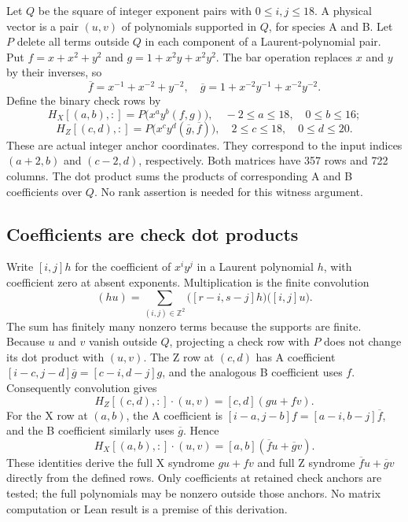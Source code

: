 \documentclass{article}
\begin{document}
Let \(Q\) be the square of integer exponent pairs with \(0 \le i, j \le 18\). A physical
vector is a pair \((u,v)\) of polynomials supported in \(Q\), for species A and B.
Let \(P\) delete all terms outside \(Q\) in each component of a Laurent-polynomial
pair. Put \(f = x + x^2 + y^2\) and \(g = 1 + x^2 y + x^2 y^2\). The bar operation
replaces \(x\) and \(y\) by their inverses, so
\begin{equation}
  \overline{f} = x^{-1} + x^{-2} + y^{-2}, \quad
  \overline{g} = 1 + x^{-2} y^{-1} + x^{-2} y^{-2}.
\end{equation}
Define the binary check rows by
\begin{equation}
  H_X[(a,b), {:}] = P\bigl(x^a y^b (f, g)\bigr), \quad -2 \le a \le 18, \quad 0 \le b \le 16;
\end{equation}
\begin{equation}
  H_Z[(c,d), {:}] = P\bigl(x^c y^d (\overline{g}, \overline{f})\bigr),
  \quad 2 \le c \le 18, \quad 0 \le d \le 20.
\end{equation}
These are actual integer anchor coordinates. They correspond to the input
indices \((a+2, b)\) and \((c-2, d)\), respectively. Both matrices have 357 rows and
722 columns. The dot product sums the products of corresponding A and B
coefficients over \(Q\). No rank assertion is needed for this witness argument.

\subsection{Coefficients are check dot products}\label{app:witness-coefficients}

Write \([i,j]h\) for the coefficient of \(x^i y^j\) in a Laurent polynomial \(h\),
with coefficient zero at absent exponents. Multiplication is the finite
convolution
\begin{equation}
  [r,s](hu) = \sum_{(i,j) \in \mathbb{Z}^2} \bigl([r-i, s-j]h\bigr) \bigl([i,j]u\bigr).
\end{equation}
The sum has finitely many nonzero terms because the supports are finite.
Because \(u\) and \(v\) vanish outside \(Q\), projecting a check row with \(P\) does not
change its dot product with \((u,v)\). The Z row at \((c,d)\) has A coefficient
\([i-c, j-d]\overline{g} = [c-i, d-j]g\), and the analogous B coefficient uses \(f\).
Consequently convolution gives
\begin{equation}
  H_Z[(c,d), {:}] \cdot (u,v) = [c,d](gu + fv).
\end{equation}
For the X row at \((a,b)\), the A coefficient is
\([i-a, j-b]f = [a-i, b-j]\overline{f}\), and the B coefficient similarly uses
\(\overline{g}\). Hence
\begin{equation}
  H_X[(a,b), {:}] \cdot (u,v) = [a,b](\overline{f} u + \overline{g} v).
\end{equation}
These identities derive the full X syndrome \(gu + fv\) and full Z syndrome
\(\overline{f} u + \overline{g} v\) directly from the defined rows. Only coefficients at
retained check anchors are tested; the full polynomials may be nonzero outside
those anchors. No matrix computation or Lean result is a premise of this derivation.
\end{document}
